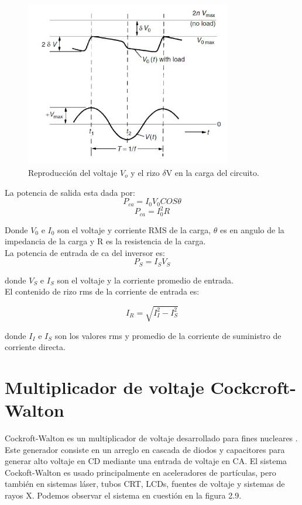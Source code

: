 \begin{figure}[H]
\centering
\includegraphics[width=9cm]{capitulo2/figs/riso.png}
\caption{ Reproducción del voltaje $V_{o}$ y el rizo $\delta$V en la carga del circuito.}
\end{figure}

La potencia de salida esta dada por: \begin{equation}
P_{ca}=I_{0}V_{0}COS\theta
\end{equation}
\begin{equation}
P_{ca}= I_{0}^{2}R
\end{equation}

Donde $V_{0}$ e $I_{0}$ son el voltaje y corriente RMS de la carga, $\theta$ es en angulo de la impedancia de la carga y R es la resistencia de la carga.\\

La potencia de entrada de ca del inversor es:\\

\begin{equation}
P_{S}=I_{S}V_{S}
\end{equation}

donde $V_{S}$ e $I_{S}$ son el voltaje y la corriente promedio de entrada.\\

El contenido de rizo rms de la corriente de entrada es:

\begin{equation}
I_{R}=\sqrt{I_{I}^{2}-I_{S}^{2}}
\end{equation}

donde $I_{I}$ e $I_{S}$ son los valores rms y promedio de la corriente de suministro de corriente directa.

 
\newpage
\section{Multiplicador de voltaje Cockcroft-Walton}
Cockroft-Walton es un multiplicador de voltaje desarrollado para fines nucleares \cite{CERN}. Este generador consiste en un arreglo en cascada de diodos y capacitores para generar alto voltaje en CD mediante una entrada de voltaje en CA. El sistema Cockoft-Walton es usado principalmente en aceleradores de partículas, pero también en sistemas láser, tubos CRT, LCDs, fuentes de voltaje y sistemas de rayos X. Podemos observar el sistema en cuestión en la figura 2.9.  

